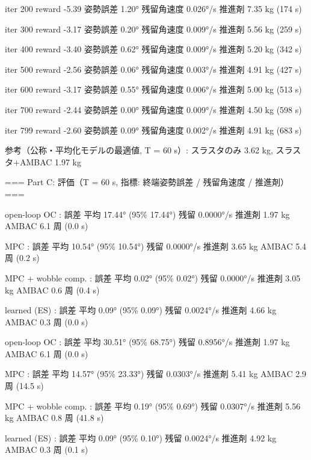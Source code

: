 {iter  200  reward    -5.39  姿勢誤差   1.20°  残留角速度 0.026°/s  推進剤   7.35 kg  (174 s)\par
iter  300  reward    -3.17  姿勢誤差   0.20°  残留角速度 0.009°/s  推進剤   5.56 kg  (259 s)\par
iter  400  reward    -3.40  姿勢誤差   0.62°  残留角速度 0.009°/s  推進剤   5.20 kg  (342 s)\par
iter  500  reward    -2.56  姿勢誤差   0.06°  残留角速度 0.003°/s  推進剤   4.91 kg  (427 s)\par
iter  600  reward    -3.17  姿勢誤差   0.55°  残留角速度 0.006°/s  推進剤   5.00 kg  (513 s)\par
iter  700  reward    -2.44  姿勢誤差   0.00°  残留角速度 0.009°/s  推進剤   4.50 kg  (598 s)\par
iter  799  reward    -2.60  姿勢誤差   0.09°  残留角速度 0.002°/s  推進剤   4.91 kg  (683 s)\par
参考（公称・平均化モデルの最適値, T = 60 s）: スラスタのみ 3.62 kg, スラスタ+AMBAC 1.97 kg\par
\mbox{}\par
=== Part C: 評価（T = 60 s, 指標: 終端姿勢誤差 / 残留角速度 / 推進剤）===\par
[nominal        ] open-loop OC       : 誤差 平均  17.44° (95\%  17.44°)  残留 0.0000°/s  推進剤   1.97 kg  AMBAC  6.1 周  (0.0 s)\par
[nominal        ] MPC                : 誤差 平均  10.54° (95\%  10.54°)  残留 0.0000°/s  推進剤   3.65 kg  AMBAC  5.4 周  (0.2 s)\par
[nominal        ] MPC + wobble comp. : 誤差 平均   0.02° (95\%   0.02°)  残留 0.0000°/s  推進剤   3.05 kg  AMBAC  0.6 周  (0.4 s)\par
[nominal        ] learned (ES)       : 誤差 平均   0.09° (95\%   0.09°)  残留 0.0024°/s  推進剤   4.66 kg  AMBAC  0.3 周  (0.0 s)\par
[randomized(100)] open-loop OC       : 誤差 平均  30.51° (95\%  68.75°)  残留 0.8956°/s  推進剤   1.97 kg  AMBAC  6.1 周  (0.0 s)\par
[randomized(100)] MPC                : 誤差 平均  14.57° (95\%  23.33°)  残留 0.0303°/s  推進剤   5.41 kg  AMBAC  2.9 周  (14.5 s)\par
[randomized(100)] MPC + wobble comp. : 誤差 平均   0.19° (95\%   0.69°)  残留 0.0307°/s  推進剤   5.56 kg  AMBAC  0.8 周  (41.8 s)\par
[randomized(100)] learned (ES)       : 誤差 平均   0.09° (95\%   0.10°)  残留 0.0024°/s  推進剤   4.92 kg  AMBAC  0.3 周  (0.1 s)\par
}

